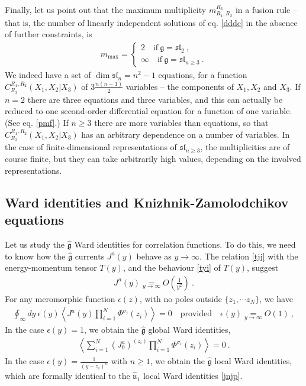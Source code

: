 \documentclass[12pt, a4paper, notitlepage, twoside]{report}
\numberwithin{equation}{section}
\theoremstyle{break}
\begin{document}
Finally, let us point out that the maximum multiplicity $m_{R_1,R_2}^{R_3}$ in a fusion rule -- that is, the number of linearly independent solutions of eq. \eqref{dddc} in the absence of further constraints, is 
\begin{align}
 m_{\mathrm{max}} = \left\{\begin{array}{l}  2 \quad \text{if}\ \mathfrak{g}=\mathfrak{sl}_2\ , \\ \infty \quad \text{if}\ \mathfrak{g}=\mathfrak{sl}_{n\geq 3}\ . \end{array}\right. 
\end{align}
We indeed have a set of $\dim \mathfrak{sl}_n=n^2-1$ equations, for a function $C^{R_1,R_2}_{R_3}(X_1,X_2|X_3)$ of $3\frac{n(n-1)}{2}$ variables -- the components of $X_1,X_2$ and $X_3$.
If $n=2$ there are three equations and three variables, and this can actually be reduced to one second-order differential equation for a function of one variable. (See eq. \eqref{pmf}.)
If $n\geq 3$ there are more variables than equations, so that $C^{R_1,R_2}_{R_3}(X_1,X_2|X_3)$ has an arbitrary dependence on a number of variables.
In the case of finite-dimensional representations of $\mathfrak{sl}_{n\geq 3}$, the multiplicities are of course finite, but they can take arbitrarily high values, depending on the involved representations.

\subsection{Ward identities and Knizhnik-Zamolodchikov equations \label{secwikz}}

Let us study the $\hat{\mathfrak{g}}$ Ward identities for correlation functions.
To do this, we need to know how the $\hat{\mathfrak{g}}$ currents $J^a(y)$ behave as $y\to \infty$.
The relation \eqref{tjj} with the energy-momentum tensor $T(y)$, and the behaviour \eqref{tyi} of $T(y)$, suggest
\begin{align}
 \boxed{J^a(y) \underset{y\to \infty}{=} O\left(\frac{1}{y^2}\right)}\ .
\label{jayi}
\end{align}
For any meromorphic function $\epsilon(z)$, with no poles outside $\{z_1,\cdots z_N\}$, we have 
\begin{align}
 \oint_\infty dy\ \epsilon(y) \left\langle J^a(y)  \prod_{i=1}^N \Phi^{\sigma_i}(z_i)\right\rangle = 0 \quad \text{provided} \quad \epsilon(y) \underset{y\to\infty}{=} O(1)\ ,
\end{align}
In the case $\epsilon(y)=1$, we obtain the $\hat{\mathfrak{g}}$ global Ward identities,
\begin{align}
 \left\langle \sum_{i=1}^N (J_0^a)^{(z_i)} \prod_{i=1}^N \Phi^{\sigma_i}(z_i)\right\rangle=0\ .
\end{align}
In the case $\epsilon(y)=\frac{1}{(y-z_i)^n}$ with $n\geq 1$, we obtain the $\hat{\mathfrak{g}}$ local Ward identities, which are formally identical to the $\hat{\mathfrak{u}}_1$ local Ward identities \eqref{jnjp}. 
\end{document}
